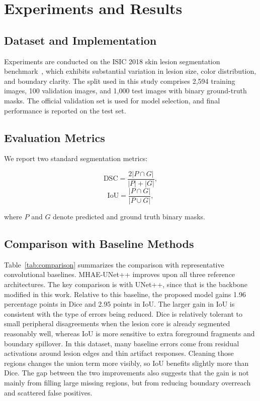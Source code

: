 \documentclass[conference]{IEEEtran}
\begin{document}
\section{Experiments and Results}

\subsection{Dataset and Implementation}

Experiments are conducted on the ISIC 2018 skin lesion segmentation benchmark~\cite{codella2018,tschandl2018}, which exhibits substantial variation in lesion size, color distribution, and boundary clarity. The split used in this study comprises 2,594 training images, 100 validation images, and 1,000 test images with binary ground-truth masks. The official validation set is used for model selection, and final performance is reported on the test set.

\subsection{Evaluation Metrics}

We report two standard segmentation metrics:

\begin{equation}
\text{DSC} = \frac{2|P \cap G|}{|P| + |G|},
\end{equation}
\begin{equation}
\text{IoU} = \frac{|P \cap G|}{|P \cup G|},
\end{equation}

where $P$ and $G$ denote predicted and ground truth binary masks.

\subsection{Comparison with Baseline Methods}

Table~\ref{tab:comparison} summarizes the comparison with representative convolutional baselines. MHAE-UNet++ improves upon all three reference architectures. The key comparison is with UNet++, since that is the backbone modified in this work. Relative to this baseline, the proposed model gains 1.96 percentage points in Dice and 2.95 points in IoU. The larger gain in IoU is consistent with the type of errors being reduced. Dice is relatively tolerant to small peripheral disagreements when the lesion core is already segmented reasonably well, whereas IoU is more sensitive to extra foreground fragments and boundary spillover. In this dataset, many baseline errors come from residual activations around lesion edges and thin artifact responses. Cleaning those regions changes the union term more visibly, so IoU benefits slightly more than Dice. The gap between the two improvements also suggests that the gain is not mainly from filling large missing regions, but from reducing boundary overreach and scattered false positives.
\end{document}
